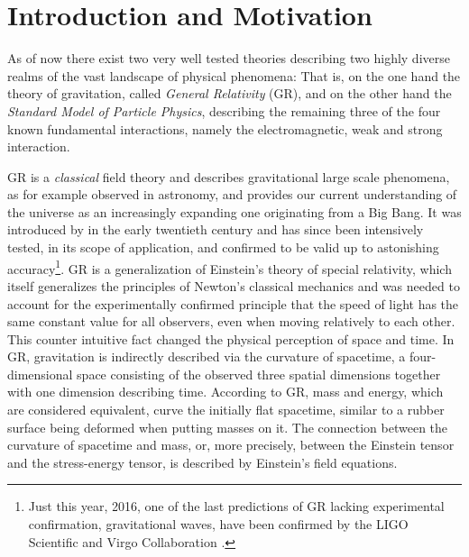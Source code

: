 \section{Introduction and Motivation}\label{chpt:introduction}
%
%
%
%
%
%
As of now there exist two very well tested theories describing two highly diverse realms of the vast landscape of physical phenomena: That is, on the one hand the theory of gravitation, called \emph{General Relativity} (GR), and on the other hand the \emph{Standard Model of Particle Physics}, describing the remaining three of the four known fundamental interactions, namely the electromagnetic, weak and strong interaction. \par
%
GR is a \emph{classical} field theory and describes gravitational large scale phenomena, as for example observed in astronomy, and provides our current understanding of the universe as an increasingly expanding one originating from a Big Bang. It was introduced by  in the early twentieth century and has since been intensively tested, in its scope of application, and confirmed to be valid up to astonishing accuracy\footnote{Just this year, 2016, one of the last predictions of GR lacking experimental confirmation, gravitational waves, have been confirmed by the LIGO Scientific and Virgo Collaboration \cite{grav_waves_detection}.}. GR is a generalization of Einstein's theory of special relativity, which itself generalizes the principles of Newton's classical mechanics and was needed to account for the experimentally confirmed principle that the speed of light has the same constant value for all observers, even when moving relatively to each other. This counter intuitive fact changed the physical perception of space and time. In GR, gravitation is indirectly described via the curvature of spacetime, a four-dimensional space consisting of the observed three spatial dimensions together with one dimension describing time. According to GR, mass and energy, which are considered equivalent, curve the initially flat spacetime, similar to a rubber surface being deformed when putting masses on it. The connection between the curvature of spacetime and mass, or, more precisely, between the Einstein tensor and the stress-energy tensor, is described by Einstein's field equations.\par
%
